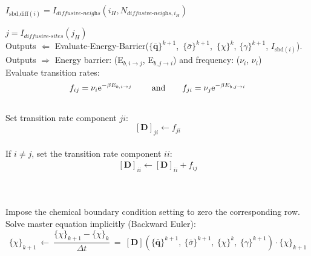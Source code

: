 \documentclass{article}
\begin{document}
\begin{algorithm}
\begin{algorithmic}
            \State $I_{\text{sbd,diff}(i)} = I_{\textit{diffusive-neighs}}(i_H, N_{\textit{diffusive-neighs},i_H})$ \\
            \vspace{0.2cm}        
        
                \State $j = I_{\textit{diffusive-sites}}(j_H)$ \\
        
                \State Outputs $\Leftarrow$ Evaluate-Energy-Barrier($\{\bar{\textbf{q}}\}^{k+1}$,\ $\{\bar{\sigma}\}^{k+1}$,\ $\{\chi\}^k$, $\{\gamma\}^{k+1}$, $I_{\text{sbd}(i)}$). \\
                
                \State Outputs $\Rightarrow$ Energy barrier: (E$_{b, i \rightarrow j}$, E$_{b, j \rightarrow i}$) and frequency: ($\nu_i$, $\nu_i$) \\
        
                \State Evaluate transition rates:
                \begin{equation*}
                    f_{ij} = \nu_i {\rm e}^{-\beta E_{b,i \rightarrow j}}\ \qquad \text{and}  \qquad f_{ji} = \nu_j {\rm e}^{-\beta E_{b,j \rightarrow i}}
                \end{equation*}\\
    
                \State Set transition rate component $ji$:
                \begin{equation*}
                    \left[\textbf{D}\right]_{ji} \leftarrow f_{ji}
                \end{equation*}\\
    
                \State If $i \neq j$, set the transition rate component $ii$:
                \begin{eqnarray*}
                    \left[\textbf{D}\right]_{ii} \leftarrow  \left[\textbf{D}\right]_{ii} + f_{ij}
                \end{eqnarray*}
         
           \EndFor \\
        
            \vspace{0.2cm}     
        \EndFor\\
        
        \State Impose the chemical boundary condition setting to zero the corresponding row.\\
        
        \State Solve master equation implicitly (Backward Euler):
        \begin{equation*}
            \{\chi\}_{k+1}\ \leftarrow\ \frac{\{\chi\}_{k+1} - \{\chi\}_{k}}{\Delta t}\ =\  \left[\textbf{D}\right] (\{\bar{\textbf{q}}\}^{k+1},\ \{\bar{\sigma}\}^{k+1},\ \{\chi\}^k,\ \{\gamma\}^{k+1}) \cdot \{\chi\}_{k+1}
        \end{equation*}
        \end{algorithmic}
        \end{algorithm}
        
\end{document}
